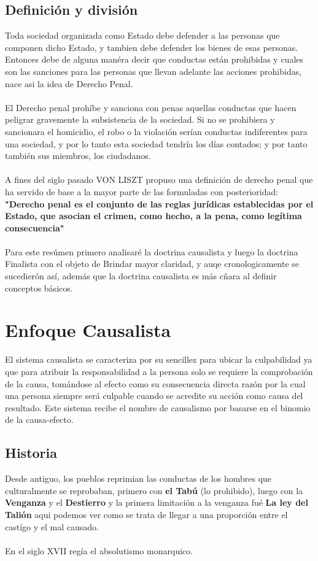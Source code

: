 \documentclass[12pt]{book}
\begin{document}
\section{Definición y división}
Toda sociedad organizada como Estado debe defender a las personas que componen dicho Estado, y tambien debe 
defender los bienes de esas personas.\\
Entonces debe de alguna manéra decir que conductas están prohibidas y cuales son las sanciones para las personas que llevan adelante las acciones prohibidas, nace asi la idea de Derecho Penal.
\\ \\
El Derecho penal prohíbe y sanciona con penas aquellas conductas que hacen
peligrar gravemente la subsistencia de la sociedad. Si no se prohibiera y
sancionara el homicidio, el robo o la violación serían conductas indiferentes
para una sociedad, y por  lo tanto esta sociedad tendría los días contados; y por tanto también
sus miembros, los ciudadanos.
\\ \\
A fines del siglo pasado VON LISZT propuso una definición de
derecho penal que ha servido de base a la mayor parte de las formuladas con posterioridad:
\textbf{"Derecho penal es el conjunto de las reglas jurídicas establecidas por el Estado, que asocian el crimen, como hecho, a la pena,
como legítima consecuencia"} \\ \\
Para este resúmen primero analisaré la doctrina causalista y luego la doctrina Finalista con el objeto de
Brindar mayor claridad, y auqe cronologicamente se sucedierón así, además que la doctrina causalista es más cñara al definir conceptos básicos.
\chapter{Enfoque Causalista}
El sistema causalista se caracteriza por su sencillez para ubicar la culpabilidad ya que para atribuir la responsabilidad a la persona solo se requiere la comprobación de la causa, tomándose al efecto como su consecuencia directa razón por la cual una persona siempre será culpable cuando se acredite su acción como causa del resultado.
Este sistema recibe el nombre de causalismo por basarse en el binomio de la causa-efecto.


\section{Historia}
Desde antiguo, los pueblos reprimian las conductas de los hombres que culturalmente se reprobaban, primero con \textbf{el Tabú} (lo prohibido), luego con la \textbf{Venganza} y el \textbf{Destierro} y la primera limitación a la venganza fué \textbf{La ley del Talión} aqui podemos ver como se trata de llegar a una proporción entre el castígo y el mal causado.\\ \\
En el siglo XVII regía el absolutismo monarquico.
\end{document}
